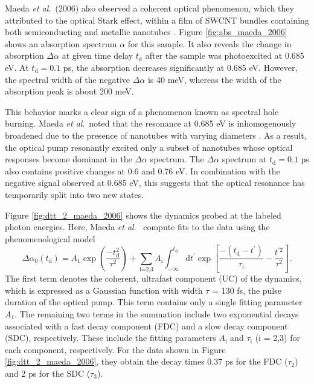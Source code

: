 Maeda \textit{et al}.\ (2006) also observed a coherent optical phenomenon, which they attributed to the optical Stark effect, within a film of SWCNT bundles containing both semiconducting and metallic nanotubes \cite{maeda2006gigantic}. Figure \ref{fig:abs_maeda_2006} shows an absorption spectrum $\alpha$ for this sample. It also reveals the change in absorption $\Delta \alpha$ at given time delay $t_\text{d}$ after the sample was photoexcited at 0.685 eV. At $t_\text{d} = 0.1$ ps, the absorption decreases significantly at 0.685 eV. However, the spectral width of the negative $\Delta\alpha$ is 40 meV, whereas the width of the absorption peak is about 200 meV.

This behavior marks a clear sign of a phenomenon known as spectral hole burning. Maeda \textit{et al}.\  noted that the resonance at 0.685 eV is inhomogenously broadened due to the presence of nanotubes with varying diameters \cite{maeda2006gigantic}. As a result, the optical pump resonantly excited only a subset of nanotubes whose optical responses become dominant in the $\Delta \alpha$ spectrum. The $\Delta \alpha$ spectrum at $t_\text{d} = 0.1$ ps also contains positive changes at 0.6 and 0.76 eV. In combination with the negative signal observed at 0.685 eV, this suggests that the optical resonance has temporarily split into two new states.


Figure \ref{fig:dtt_2_maeda_2006} shows the dynamics probed at the labeled photon energies. Here, Maeda \textit{et al}.\ \cite{maeda2006gigantic} compute fits to the data using the phenomenological model
\begin{equation}
	\Delta \alpha_0(t_\text{d}) = A_1 \exp\left( \frac{-t_\text{d}^2}{\tau^2}\right) + \sum_\text{i=2,3} A_\text{i} \int^{t_\text{d}}_{-\infty} \mathrm{d} t^\prime \exp\left[ \frac{-(t_\text{d} - t^\prime)}{\tau_\text{i}} - \frac{t^{\prime 2}}{\tau^2}\right].
	\label{eq:fits_maeda_2006}
\end{equation}
The first term denotes the coherent, ultrafast component (UC) of the dynamics, which is expressed as a Gaussian function with width $\tau$ = 130 fs, the pulse duration of the optical pump. This term contains only a single fitting parameter $A_1$. The remaining two terms in the summation include two exponential decays associated with a fast decay component (FDC) and a slow decay component (SDC), respectively. These include the fitting parameters $A_\text{i}$ and $\tau_\text{i}$ (i = 2,3) for each component, respectively. For the data shown in Figure \ref{fig:dtt_2_maeda_2006}, they obtain the decay times 0.37 ps for the FDC ($\tau_2$) and 2 ps for the SDC ($\tau_3$).


